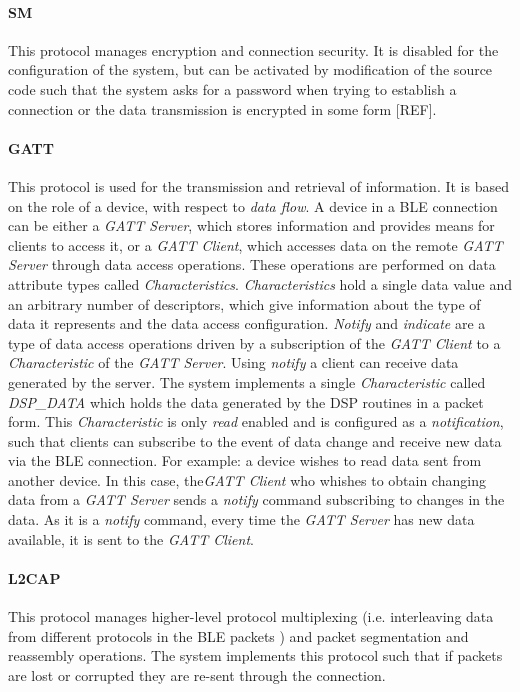 \paragraph{SM}
This protocol manages encryption and connection security. It is disabled for the configuration of the system, but can be activated by modification of the source code such that the system asks for a password when trying to establish a connection or the data transmission is encrypted in some form [REF].

\paragraph{GATT}
This protocol is used for the transmission and retrieval of information. It is based on the role of a device, with respect to \textit{data flow}. A device in a BLE connection can be either a \textit{GATT Server}, which stores information and provides means for clients to access it, or a \textit{GATT Client}, which accesses data on the remote \textit{GATT Server} through data access operations. These operations are performed on data attribute types called \textit{Characteristics}. \textit{Characteristics} hold a single data value and an arbitrary number of descriptors, which give information about the type of data it represents and the data access configuration. \textit{Notify} and \textit{indicate} are a type of data access operations driven by a subscription of the \textit{GATT Client} to a \textit{Characteristic} of the \textit{GATT Server}. Using \textit{notify} a client can receive data generated by the server. The system implements a single \textit{Characteristic} called \textit{DSP\_DATA} which holds the data generated by the DSP routines in a packet form. This \textit{Characteristic} is only \textit{read} enabled and is configured as a \textit{notification}, such that clients can subscribe to the event of data change and receive new data via the BLE connection. For example: a device wishes to read data sent from another device. In this case, the\textit{GATT Client} who whishes to obtain changing data from a \textit{GATT Server} sends a \textit{notify} command subscribing to changes in the data. As it is a \textit{notify} command, every time the \textit{GATT Server} has new data available, it is sent to the \textit{GATT Client}.

\paragraph{L2CAP}
This protocol manages higher-level protocol multiplexing (i.e. interleaving data from different protocols in the BLE packets \cite{Blel2cap}) and packet segmentation and reassembly operations. The system implements this protocol such that if packets are lost or corrupted they are re-sent through the connection.

